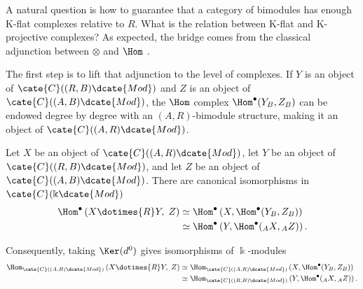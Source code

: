 A natural question is how to guarantee that a category of bimodules has
enough K-flat complexes relative to $R$. What is the relation between K-flat
and K-projective complexes? As expected, the bridge comes from the classical
adjunction between $\otimes$ and $\Hom$ \cite[Theorem 6.6.5]{Li1}.

The first step is to lift that adjunction to the level of complexes. If $Y$ is
an object of $\cate{C}((R,B)\dcate{Mod})$ and $Z$ is an object of
$\cate{C}((A,B)\dcate{Mod})$, the $\Hom$ complex
$\Hom^\bullet(Y_B,Z_B)$ can be endowed degree by degree with an
$(A,R)$-bimodule structure, making it an object of
$\cate{C}((A,R)\dcate{Mod})$.

\begin{proposition}\label{prop:tensor-Hom-cplx}
	Let $X$ be an object of $\cate{C}((A,R)\dcate{Mod})$, let $Y$ be an object
	of $\cate{C}((R,B)\dcate{Mod})$, and let $Z$ be an object of
	$\cate{C}((A,B)\dcate{Mod})$. There are canonical isomorphisms in
	$\cate{C}(\Bbbk\dcate{Mod})$
	\begin{align*}
		\Hom^\bullet\left( X \dotimes{R} Y, \; Z \right) & \simeq \Hom^\bullet\left( X, \Hom^\bullet(Y_B, Z_B) \right) \\
		& \simeq \Hom^\bullet\left( Y, \Hom^\bullet({}_A X, {}_A Z) \right).
	\end{align*}

	Consequently, taking $\Ker(d^0)$ gives isomorphisms of $\Bbbk$-modules
	\begin{align*}
		\Hom_{\cate{C}((A, B)\dcate{Mod})}\left( X \dotimes{R} Y, \; Z \right) & \simeq \Hom_{\cate{C}((A, R)\dcate{Mod})}\left( X, \Hom^\bullet(Y_B, Z_B) \right) \\
		& \simeq \Hom_{\cate{C}((R, B)\dcate{Mod})}\left( Y, \Hom^\bullet({}_A X, {}_A Z) \right).
	\end{align*}
\end{proposition}

